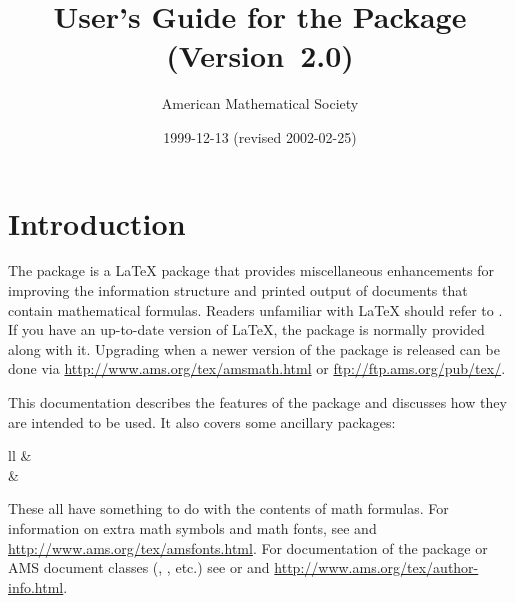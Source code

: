 \documentclass[leqno,titlepage,openany]{amsldoc}[1999/12/13]
\title{User's Guide for the \pkg{amsmath} Package (Version~2.0)}
\author{American Mathematical Society}
\date{1999-12-13 (revised 2002-02-25)}
\begin{document}
\frontmatter

\maketitle
\pagestyle{headings}
\tableofcontents
\cleardoublepage %

\mainmatter
\chapter{Introduction}

The  package is a \LaTeX{} package that provides
miscellaneous enhancements for improving the information structure and
printed output of documents that contain mathematical formulas. Readers
unfamiliar with \LaTeX{} should refer to \cite{lamport}. If you have an
up-to-date version of \LaTeX{}, the  package is normally
provided along with it. Upgrading when a newer version of the
 package is released can be done via
\url{http://www.ams.org/tex/amsmath.html} or
\url{ftp://ftp.ams.org/pub/tex/}.

This documentation describes the features of the  package
and discusses how they are intended to be used. It also covers some
ancillary packages:
\begin{ctab}{ll}
& \\
& \\
\end{ctab}
These all have something to do with the contents of math formulas. For
information on extra math symbols and math fonts, see \cite{amsfonts}
and \url{http://www.ams.org/tex/amsfonts.html}. For documentation of the
 package or AMS document classes (,
, etc.\@) see \cite{amsthdoc} or \cite{instr-l} and
\url{http://www.ams.org/tex/author-info.html}.
\end{document}
